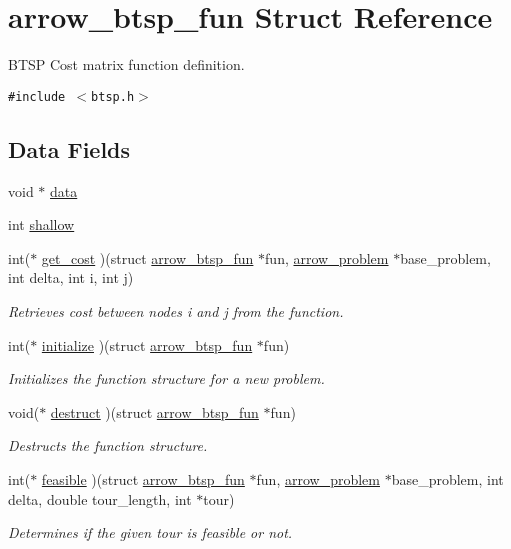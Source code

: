 \hypertarget{structarrow__btsp__fun}{
\section{arrow\_\-btsp\_\-fun Struct Reference}
\label{structarrow__btsp__fun}
}
BTSP Cost matrix function definition.  


{\tt \#include $<$btsp.h$>$}

\subsection*{Data Fields}
\begin{CompactItemize}
\item 
void $\ast$ \hyperlink{structarrow__btsp__fun_9c1a276685fb0cac372faef2dd2ba99a}{data}
\item 
int \hyperlink{structarrow__btsp__fun_1950686e4862a4b1bd68d1ada85e2c79}{shallow}
\item 
int($\ast$ \hyperlink{structarrow__btsp__fun_56eb57e90eae76571a024894bd0fe570}{get\_\-cost} )(struct \hyperlink{structarrow__btsp__fun}{arrow\_\-btsp\_\-fun} $\ast$fun, \hyperlink{structarrow__problem}{arrow\_\-problem} $\ast$base\_\-problem, int delta, int i, int j)
\begin{CompactList}\small\item\em Retrieves cost between nodes i and j from the function. \item\end{CompactList}\item 
int($\ast$ \hyperlink{structarrow__btsp__fun_c588686921bd526653a7e0d7816aee44}{initialize} )(struct \hyperlink{structarrow__btsp__fun}{arrow\_\-btsp\_\-fun} $\ast$fun)
\begin{CompactList}\small\item\em Initializes the function structure for a new problem. \item\end{CompactList}\item 
void($\ast$ \hyperlink{structarrow__btsp__fun_6c66b7591252728aaa441139c623446a}{destruct} )(struct \hyperlink{structarrow__btsp__fun}{arrow\_\-btsp\_\-fun} $\ast$fun)
\begin{CompactList}\small\item\em Destructs the function structure. \item\end{CompactList}\item 
int($\ast$ \hyperlink{structarrow__btsp__fun_39eb61a5ad9a5786e773cce4affd2150}{feasible} )(struct \hyperlink{structarrow__btsp__fun}{arrow\_\-btsp\_\-fun} $\ast$fun, \hyperlink{structarrow__problem}{arrow\_\-problem} $\ast$base\_\-problem, int delta, double tour\_\-length, int $\ast$tour)
\begin{CompactList}\small\item\em Determines if the given tour is feasible or not. \item\end{CompactList}\end{CompactItemize}


